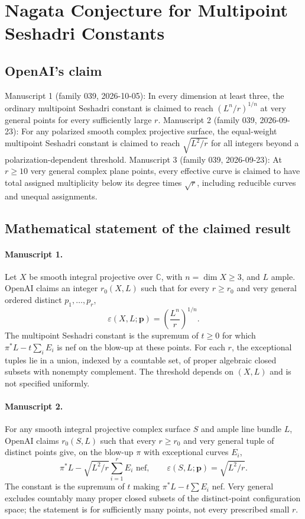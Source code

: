 \documentclass[11pt]{article}
\begin{document}
\section*{Nagata Conjecture for Multipoint Seshadri Constants}

\subsection{OpenAI's claim}
Manuscript 1 (family 039, 2026-10-05): In every dimension at least three, the ordinary multipoint Seshadri constant is claimed to reach $(L^n/r)^{1/n}$ at very general points for every sufficiently large $r$. Manuscript 2 (family 039, 2026-09-23): For any polarized smooth complex projective surface, the equal-weight multipoint Seshadri constant is claimed to reach $\sqrt{L^2/r}$ for all integers beyond a polarization-dependent threshold. Manuscript 3 (family 039, 2026-09-23): At $r\ge10$ very general complex plane points, every effective curve is claimed to have total assigned multiplicity below its degree times $\sqrt r$, including reducible curves and unequal assignments.

\subsection{Mathematical statement of the claimed result}
\paragraph{Manuscript 1.}
Let $X$ be smooth integral projective over $\mathbb C$, with $n=\dim X\ge3$, and $L$ ample. OpenAI claims an integer $r_0(X,L)$ such that for every $r\ge r_0$ and very general ordered distinct $p_1,\ldots,p_r$,
\[
\varepsilon(X,L;\mathbf p)=\left(\frac{L^n}{r}\right)^{1/n}.
\]
The multipoint Seshadri constant is the supremum of $t\ge0$ for which $\pi^*L-t\sum_iE_i$ is nef on the blow-up at these points. For each $r$, the exceptional tuples lie in a union, indexed by a countable set, of proper algebraic closed subsets with nonempty complement. The threshold depends on $(X,L)$ and is not specified uniformly.

\paragraph{Manuscript 2.}
For any smooth integral projective complex surface $S$ and ample line bundle $L$, OpenAI claims $r_0(S,L)$ such that every $r\ge r_0$ and very general tuple of distinct points give, on the blow-up $\pi$ with exceptional curves $E_i$,
\[
\pi^*L-\sqrt{L^2/r}\sum_{i=1}^rE_i\text{ nef},\qquad
\varepsilon(S,L;\mathbf p)=\sqrt{L^2/r}.
\]
The constant is the supremum of $t$ making $\pi^*L-t\sum E_i$ nef. Very general excludes countably many proper closed subsets of the distinct-point configuration space; the statement is for sufficiently many points, not every prescribed small $r$.
\end{document}

